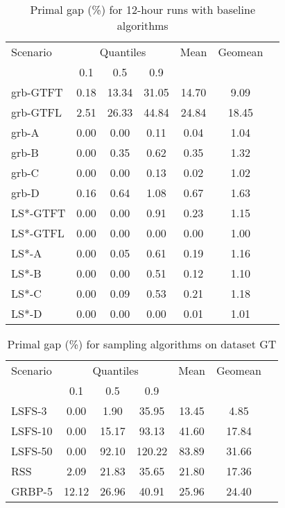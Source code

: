 \documentclass[3p, authoryear, times, doubleblind]{elsarticle}
\begin{document}
{\begin{table}[h]
\centering
\caption{Primal gap (\%) for 12-hour runs with baseline algorithms}
\label{tab:primal_gap_12h}
\begin{tabular}{lcccccc}
\toprule
{Scenario} & \multicolumn{3}{c}{Quantiles} & {Mean} & {Geomean} \\
{} & {0.1} & {0.5} & {0.9} & {} & {} \\
\midrule
grb-GTFT & 0.18 & 13.34 & 31.05 & 14.70 & 9.09 \\
grb-GTFL & 2.51 & 26.33 & 44.84 & 24.84 & 18.45 \\
grb-A & 0.00 & 0.00 & 0.11 & 0.04 & 1.04 \\
grb-B & 0.00 & 0.35 & 0.62 & 0.35 & 1.32 \\
grb-C & 0.00 & 0.00 & 0.13 & 0.02 & 1.02 \\
grb-D & 0.16 & 0.64 & 1.08 & 0.67 & 1.63 \\
LS*-GTFT & 0.00 & 0.00 & 0.91 & 0.23 & 1.15 \\
LS*-GTFL & 0.00 & 0.00 & 0.00 & 0.00 & 1.00 \\
LS*-A & 0.00 & 0.05 & 0.61 & 0.19 & 1.16 \\
LS*-B & 0.00 & 0.00 & 0.51 & 0.12 & 1.10 \\
LS*-C & 0.00 & 0.09 & 0.53 & 0.21 & 1.18 \\
LS*-D & 0.00 & 0.00 & 0.00 & 0.01 & 1.01 \\
\bottomrule
\end{tabular}
\end{table}


\begin{table}[h]
\centering
\caption{Primal gap (\%) for sampling algorithms on dataset GT}
\label{tab:primal_gap_samplingGT}
\begin{tabular}{lcccccc}
\toprule
{Scenario} & \multicolumn{3}{c}{Quantiles} & {Mean} & {Geomean} \\
{} & {0.1} & {0.5} & {0.9} & {} & {} \\
\midrule
LSFS-3 & 0.00 & 1.90 & 35.95 & 13.45 & 4.85 \\
LSFS-10 & 0.00 & 15.17 & 93.13 & 41.60 & 17.84 \\
LSFS-50 & 0.00 & 92.10 & 120.22 & 83.89 & 31.66 \\
RSS & 2.09 & 21.83 & 35.65 & 21.80 & 17.36 \\
GRBP-5 & 12.12 & 26.96 & 40.91 & 25.96 & 24.40 \\
\bottomrule
\end{tabular}
\end{table}


}
\end{document}
